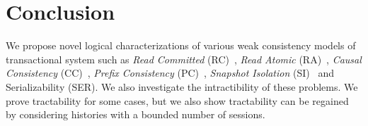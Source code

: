 \section{Conclusion}
\label{sec:txn:conclusion}

We propose novel logical characterizations of various weak consistency models of transactional system such as \emph{Read Committed} (RC)~\cite{DBLP:conf/sigmod/BerensonBGMOO95}, \emph{Read Atomic} (RA)~\cite{DBLP:conf/concur/Cerone0G15},  \emph{Causal Consistency} (CC)~\cite{DBLP:journals/cacm/Lamport78}, \emph{Prefix Consistency} (PC)~\cite{DBLP:conf/ecoop/BurckhardtLPF15}, \emph{Snapshot Isolation} (SI)~\cite{DBLP:conf/sigmod/BerensonBGMOO95} and Serializability (SER). We also investigate the intractibility of these problems. We prove tractability for some cases, but we also show tractability can be regained by considering histories with a bounded number of sessions.